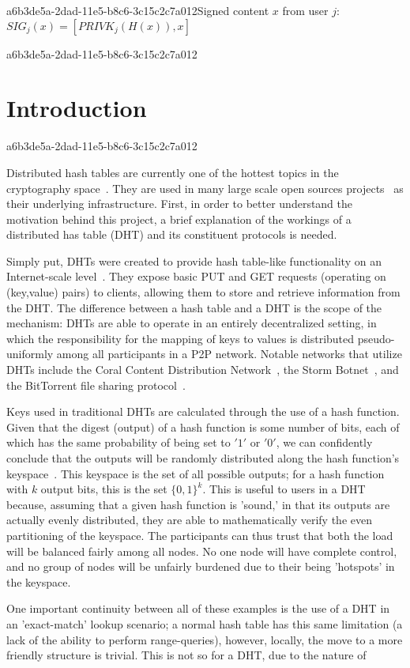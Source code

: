 \documentclass[12pt]{article}
\begin{document}
a6b3de5a-2dad-11e5-b8c6-3c15c2c7a012Signed content $x$ from user $j$: $SIG_j(x) = \left[ PRIVK_j( H(x) ), x \right]$

a6b3de5a-2dad-11e5-b8c6-3c15c2c7a012\section{Introduction}
a6b3de5a-2dad-11e5-b8c6-3c15c2c7a012\par Distributed hash tables are currently one of the hottest topics in the cryptography space~\cite{Stoica:2001dj,Rowstron:2001ea,Ratnasamy:2001wn}. They are used in many large scale open sources projects~\cite{Freitas:2013tb,Xu:2010vs,Perfitt:2010fh} as their underlying infrastructure. First, in order to better understand the motivation behind this project, a brief explanation of the workings of a distributed has table (DHT) and its constituent protocols is needed.

\par Simply put, DHTs were created to provide hash table-like functionality on an Internet-scale level~\cite{Ratnasamy:2001wn}. They expose basic PUT and GET requests (operating on (key,value) pairs) to clients, allowing them to store and retrieve information from the DHT. The difference between a hash table and a DHT is the scope of the mechanism: DHTs are able to operate in an entirely decentralized setting, in which the responsibility for the mapping of keys to values is distributed pseudo-uniformly among all participants in a P2P network. Notable networks that utilize DHTs include the Coral Content Distribution Network~\cite{Freedman:2004vb}, the Storm Botnet~\cite{Holz:2008uk}, and the BitTorrent file sharing protocol~\cite{Cohen:y1_8mBnw}.

\par Keys used in traditional DHTs are calculated through the use of a hash function. Given that the digest (output) of a hash function is some number of bits, each of which has the same probability of being set to $'1'$ or $'0'$, we can confidently conclude that the outputs will be randomly distributed along the hash function's keyspace~. This keyspace is the set of all possible outputs; for a hash function with $k$ output bits, this is the set $\{0,1\}^k$. This is useful to users in a DHT because, assuming that a given hash function is 'sound,' in that its outputs are actually evenly distributed, they are able to mathematically verify the even partitioning of the keyspace. The participants can thus trust that both the load will be balanced fairly among all nodes. No one node will have complete control, and no group of nodes will be unfairly burdened due to their being 'hotspots' in the keyspace.~

\par One important continuity between all of these examples is the use of a DHT in an 'exact-match' lookup scenario; a normal hash table has this same limitation (a lack of the ability to perform range-queries), however, locally, the move to a more friendly structure is trivial. This is not so for a DHT, due to the nature of
\printbibliography
\end{document}
